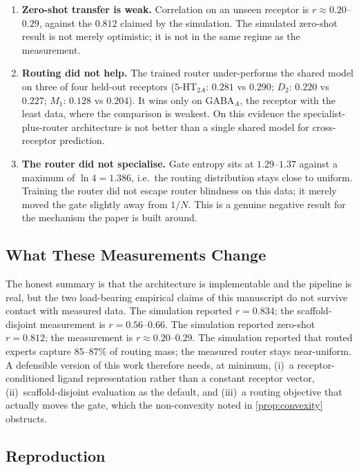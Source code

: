 \begin{enumerate}[leftmargin=1.5em,noitemsep]
    \item \textbf{Zero-shot transfer is weak.} Correlation on an unseen receptor is $r \approx 0.20$--$0.29$, against the $0.812$ claimed by the simulation. The simulated zero-shot result is not merely optimistic; it is not in the same regime as the measurement.
    \item \textbf{Routing did not help.} The trained router under-performs the shared model on three of four held-out receptors ($5\text{-HT}_{2A}$: $0.281$ vs $0.290$; $D_2$: $0.220$ vs $0.227$; $M_1$: $0.128$ vs $0.204$). It wins only on GABA$_A$, the receptor with the least data, where the comparison is weakest. On this evidence the specialist-plus-router architecture is not better than a single shared model for cross-receptor prediction.
    \item \textbf{The router did not specialise.} Gate entropy sits at $1.29$--$1.37$ against a maximum of $\ln 4 = 1.386$, i.e.\ the routing distribution stays close to uniform. Training the router did not escape router blindness on this data; it merely moved the gate slightly away from $1/N$. This is a genuine negative result for the mechanism the paper is built around.
\end{enumerate}

\subsection{What These Measurements Change}

The honest summary is that the architecture is implementable and the pipeline is real, but the two load-bearing empirical claims of this manuscript do not survive contact with measured data. The simulation reported $r = 0.834$; the scaffold-disjoint measurement is $r = 0.56$--$0.66$. The simulation reported zero-shot $r = 0.812$; the measurement is $r \approx 0.20$--$0.29$. The simulation reported that routed experts capture $85$--$87\%$ of routing mass; the measured router stays near-uniform. A defensible version of this work therefore needs, at minimum, (i)~a receptor-conditioned ligand representation rather than a constant receptor vector, (ii)~scaffold-disjoint evaluation as the default, and (iii)~a routing objective that actually moves the gate, which the non-convexity noted in \cref{prop:convexity} obstructs.

\subsection{Reproduction}
\label{sec:real_repro}

